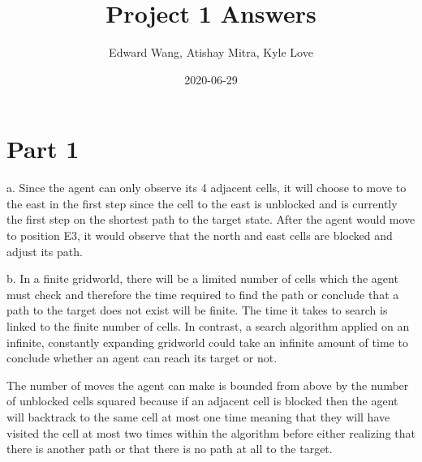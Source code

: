 \documentclass{article}
\title{Project 1 Answers}
\date{2020-06-29}
\author{Edward Wang, Atishay Mitra, Kyle Love}
\begin{document}
\maketitle

\section{Part 1}
a. Since the agent can only observe its 4 adjacent cells, it will choose to move to the east in the first step since the cell to the east is unblocked and is currently the first step on the shortest path to the target state. After the agent would move to position E3, it would observe that the north and east cells are blocked and adjust its path. 

b. In a finite gridworld, there will be a limited number of cells which the agent must check and therefore the time required to find the path or conclude that a path to the target does not exist will be finite. The time it takes to search is linked to the finite number of cells. In contrast, a search algorithm applied on an infinite, constantly expanding gridworld could take an infinite amount of time to conclude whether an agent can reach its target or not.

The number of moves the agent can make is bounded from above by the number of unblocked cells squared because if an adjacent cell is blocked then the agent will backtrack to the same cell at most one time meaning that they will have visited the cell at most two times within the algorithm before either realizing that there is another path or that there is no path at all to the target. 
\end{document}
